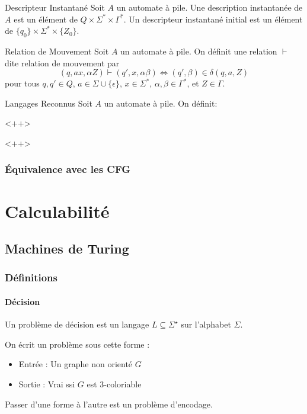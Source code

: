\documentclass{cours}
\begin{document}
\begin{définition}
	{Descripteur Instantané}{}
	Soit $A$ un automate à pile. Une description instantanée de $A$ est un élément de $Q \times \Sigma^{*} \times \Gamma^{*}$. Un descripteur instantané initial est un élément de $\{q_0\} \times \Sigma^{*}\times \{Z_{0}\}$. 
\end{définition}

\begin{définition}
	{Relation de Mouvement}{}
	Soit $A$ un automate à pile. On définit une relation $\vdash$ dite relation de mouvement par 
	\begin{equation*}
		(q, ax, \alpha Z) \vdash (q', x, \alpha \beta) \Longleftrightarrow (q', \beta) \in \delta(q, a, Z)
	\end{equation*}
	pour tous $q, q'\in Q$, $a \in \Sigma \cup \{\epsilon\}$, $x \in \Sigma^{*}$, $\alpha, \beta \in \Gamma^{*}$, et $Z \in \Gamma$.
\end{définition}

\begin{définition}
	{Langages Reconnus}{}
	Soit $A$ un automate à pile. On définit: 
	\begin{itemize}
		\item $T(A) = \left\{\omega \in \Sigma^{*} \middle| 
	\end{itemize}<++>
\end{définition}<++>

\subsection{Équivalence avec les CFG}
\chapter{Calculabilité}
\section{Machines de Turing}
\subsection{Définitions}
\subsubsection{Décision}
\begin{definition}
    Un problème de décision est un langage $L \subseteq \Sigma^{\star}$ sur l'alphabet $\Sigma$.
\end{definition}
\begin{example} 
    On écrit un problème sous cette forme : 
    \begin{itemize}
        \item Entrée : Un graphe non orienté $G$
        \item Sortie : Vrai ssi $G$ est $3$-coloriable
    \end{itemize}
    Passer d'une forme à l'autre est un problème d'encodage.
\end{example}
\end{document}
